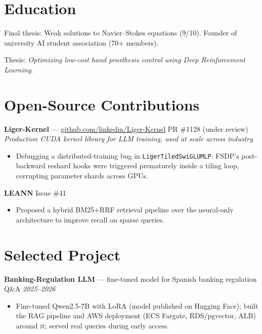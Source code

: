 \documentclass[10pt,a4paper]{article}
\begin{document}
\section{Education}

\par Final thesis: Weak solutions to Navier--Stokes equations (9/10). Founder of university AI student association (70+ members).

\vspace{4pt}
\par Thesis: \emph{Optimizing low-cost hand prosthesis control using Deep Reinforcement Learning}.

\section{Open-Source Contributions}

\noindent
\textbf{Liger-Kernel} --- \href{https://github.com/linkedin/Liger-Kernel}{github.com/linkedin/Liger-Kernel} \hfill PR \#1128 (under review)\\
\textit{Production CUDA kernel library for LLM training, used at scale across industry}
\begin{itemize}
  \item Debugging a distributed-training bug in \texttt{LigerTiledSwiGLUMLP}: FSDP's post-backward reshard hooks were triggered prematurely inside a tiling loop, corrupting parameter shards across GPUs.
\end{itemize}

\vspace{4pt}
\noindent
\textbf{LEANN} \hfill Issue \#41
\begin{itemize}
  \item Proposed a hybrid BM25+RRF retrieval pipeline over the neural-only architecture to improve recall on sparse queries.
\end{itemize}

\section{Selected Project}

\noindent
\textbf{Banking-Regulation LLM} --- fine-tuned model for Spanish banking regulation Q\&A \hfill \textit{2025--2026}
\begin{itemize}
  \item Fine-tuned Qwen2.5-7B with LoRA (model published on Hugging Face); built the RAG pipeline and AWS deployment (ECS Fargate, RDS/pgvector, ALB) around it; served real queries during early access. %
\end{itemize}
\end{document}
